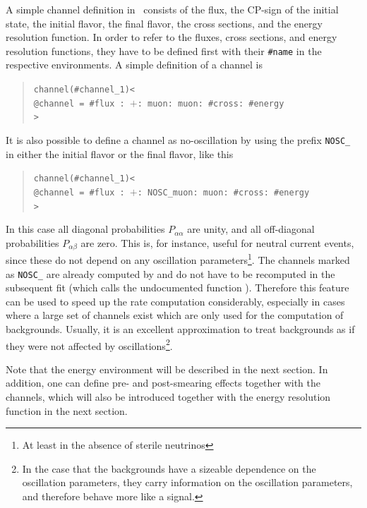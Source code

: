 A simple channel definition in \GLOBES\ consists of the flux,
the CP-sign of the initial state, the initial flavor, the final flavor,
the cross sections, and the energy resolution function. In order to refer to
the fluxes, cross sections, and energy resolution functions, they have to be 
defined first with their {\tt \#name} in the respective environments. 
A simple definition of a channel is
\begin{quote}
{\tt channel(\#channel\_1)<\\
\tb @channel = \#flux : $+$: muon: muon: \#cross: \#energy\\
>}
\end{quote}
%
It is also possible to define a channel as no-oscillation by using the
prefix {\tt NOSC\_} 
in either the initial  flavor or 
the final flavor, like this
\begin{quote}
{\tt channel(\#channel\_1)<\\
\tb @channel = \#flux : $+$: NOSC\_muon: muon: \#cross: \#energy\\
>}
\end{quote}
%
In this case all diagonal probabilities $P_{\alpha\alpha}$ are unity, and all off-diagonal probabilities  $P_{\alpha\beta}$ are zero. This is,
for instance, useful for
neutral current events, since these do not depend on any oscillation 
parameters\footnote{At least in the absence of sterile neutrinos}. The channels
marked as {\tt NOSC\_} are already computed by 
and do not have to be recomputed in the subsequent fit (which calls the undocumented function ).
Therefore this feature can be used to speed up the rate 
computation considerably, especially in cases where a large set
of channels exist which are only used for the computation of backgrounds.
Usually, it is an excellent approximation to treat backgrounds as if they
were not affected by oscillations\footnote{In the case that the backgrounds have
a sizeable dependence on the oscillation parameters, they carry information
on the oscillation parameters, and therefore behave more like a signal.}.

Note that the energy environment will be described in the next section. 
In addition, one can define pre- and post-smearing effects together
with the channels, which will also be introduced together with the
energy resolution function in the next section.

